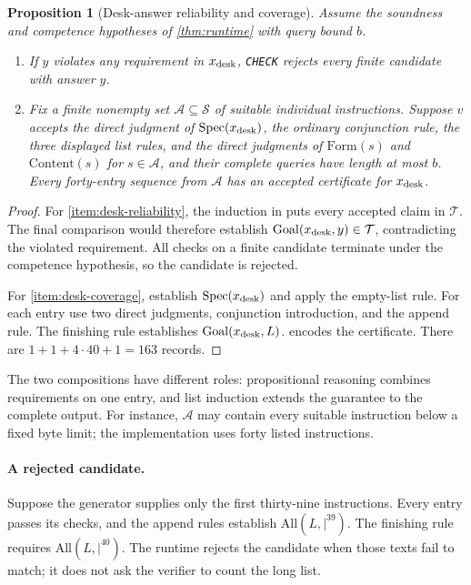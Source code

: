 \documentclass[11pt,twoside]{article}
\newtheorem{proposition}[theorem]{Proposition}
\theoremstyle{definition}
\newcommand{\Stext}{\mathcal S}
\newcommand{\True}{\mathcal T}
\newcommand{\Goal}{\operatorname{Goal}}
\begin{document}
\begin{proposition}[Desk-answer reliability and coverage]
Assume the soundness and competence hypotheses of \cref{thm:runtime}
with query bound $b$.
\begin{enumerate}[label=(\roman*),leftmargin=*]
\item \label{item:desk-reliability}If $y$ violates any requirement in
$x_{\rm desk}$, \texttt{CHECK}
rejects every finite candidate with answer $y$.
\item \label{item:desk-coverage}Fix a finite nonempty set
$\mathcal A\subseteq\Stext$ of suitable
individual instructions. Suppose $v$ accepts the direct judgment of
$\mathrm{Spec}(x_{\rm desk})$, the ordinary conjunction rule,
the three displayed list rules, and the direct judgments of $\mathrm{Form}(s)$ and
$\mathrm{Content}(s)$ for $s\in\mathcal A$, and their complete queries have
length at most $b$. Every forty-entry sequence from $\mathcal A$ has an
accepted certificate for $x_{\rm desk}$.
\end{enumerate}
\end{proposition}
\begin{proof}
For \cref{item:desk-reliability}, the induction in
 puts every
accepted claim in $\True$. The final comparison would therefore establish
$\Goal(x_{\rm desk},y)\in\True$, contradicting the violated requirement.
All checks on a finite candidate terminate under the competence hypothesis,
so the candidate is rejected.

For \cref{item:desk-coverage}, establish
$\mathrm{Spec}(x_{\rm desk})$ and apply the empty-list rule. For each entry use two direct
judgments, conjunction introduction, and the append rule. The finishing rule
establishes $\Goal(x_{\rm desk},L)$. 
encodes the certificate. There are
$1+1+4\cdot40+1=163$ records.
\end{proof}
The two compositions have different roles: propositional reasoning combines
requirements on one entry, and list induction extends the guarantee to the
complete output. For instance, $\mathcal A$ may contain every suitable instruction
below a fixed byte limit; the implementation uses forty listed instructions.

\paragraph{A rejected candidate.}
Suppose the generator supplies only the first thirty-nine instructions.
Every entry passes its checks, and the append rules establish
$\mathrm{All}(L,\texttt{|}^{39})$. The finishing rule requires
$\mathrm{All}(L,\texttt{|}^{40})$. The runtime rejects the candidate when
those texts fail to match; it does not ask the verifier to count the long list.
\end{document}
